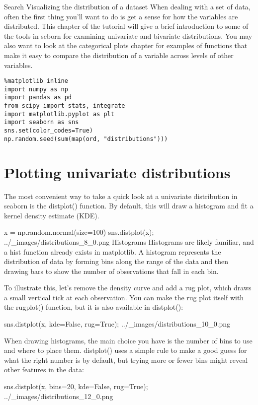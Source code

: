 
\begin{frame}
Search
Visualizing the distribution of a dataset
When dealing with a set of data, often the first thing you’ll want to do is get a sense for how the variables are distributed. This chapter of the tutorial will give a brief introduction to some of the tools in seborn for examining univariate and bivariate distributions. You may also want to look at the categorical plots chapter for examples of functions that make it easy to compare the distribution of a variable across levels of other variables.
\end{frame}
\begin{frame}[fragile]
\begin{framed}
\begin{verbatim}
%matplotlib inline
import numpy as np
import pandas as pd
from scipy import stats, integrate
import matplotlib.pyplot as plt
import seaborn as sns
sns.set(color_codes=True)
np.random.seed(sum(map(ord, "distributions")))
\end{verbatim}
\end{framed}
\end{frame}
\section{Plotting univariate distributions}
\begin{frame}[fragile]
The most convenient way to take a quick look at a univariate distribution in seaborn is the distplot() function. By default, this will draw a histogram and fit a kernel density estimate (KDE).

x = np.random.normal(size=100)
sns.distplot(x);
../_images/distributions_8_0.png
Histograms
Histograms are likely familiar, and a hist function already exists in matplotlib. A histogram represents the distribution of data by forming bins along the range of the data and then drawing bars to show the number of observations that fall in each bin.
\end{frame}
\begin{frame}
To illustrate this, let’s remove the density curve and add a rug plot, which draws a small vertical tick at each observation. You can make the rug plot itself with the rugplot() function, but it is also available in distplot():

sns.distplot(x, kde=False, rug=True);
../_images/distributions_10_0.png
\end{frame}
\begin{frame}
When drawing histograms, the main choice you have is the number of bins to use and where to place them. distplot() uses a simple rule to make a good guess for what the right number is by default, but trying more or fewer bins might reveal other features in the data:

sns.distplot(x, bins=20, kde=False, rug=True);
../_images/distributions_12_0.png
\end{frame}
